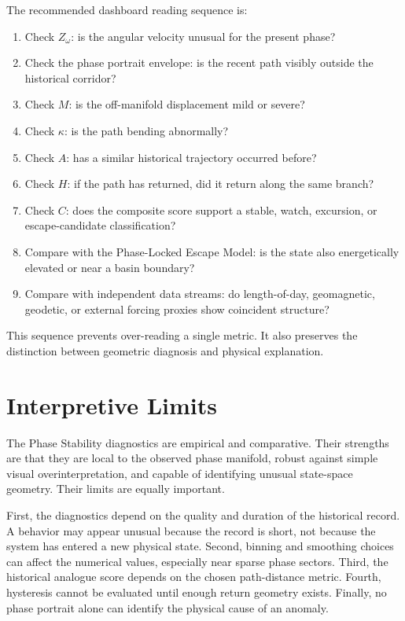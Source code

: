 \documentclass[11pt]{article}
\begin{document}
The recommended dashboard reading sequence is:

\begin{enumerate}[leftmargin=1.5em]
\item Check \(Z_{\omega}\): is the angular velocity unusual for the present phase?
\item Check the phase portrait envelope: is the recent path visibly outside the historical corridor?
\item Check \(M\): is the off-manifold displacement mild or severe?
\item Check \(\kappa\): is the path bending abnormally?
\item Check \(A\): has a similar historical trajectory occurred before?
\item Check \(H\): if the path has returned, did it return along the same branch?
\item Check \(C\): does the composite score support a stable, watch, excursion, or escape-candidate classification?
\item Compare with the Phase-Locked Escape Model: is the state also energetically elevated or near a basin boundary?
\item Compare with independent data streams: do length-of-day, geomagnetic, geodetic, or external forcing proxies show coincident structure?
\end{enumerate}

This sequence prevents over-reading a single metric. It also preserves the distinction between geometric diagnosis and physical explanation.

\section{Interpretive Limits}

The Phase Stability diagnostics are empirical and comparative. Their strengths are that they are local to the observed phase manifold, robust against simple visual overinterpretation, and capable of identifying unusual state-space geometry. Their limits are equally important.

First, the diagnostics depend on the quality and duration of the historical record. A behavior may appear unusual because the record is short, not because the system has entered a new physical state. Second, binning and smoothing choices can affect the numerical values, especially near sparse phase sectors. Third, the historical analogue score depends on the chosen path-distance metric. Fourth, hysteresis cannot be evaluated until enough return geometry exists. Finally, no phase portrait alone can identify the physical cause of an anomaly.
\end{document}
